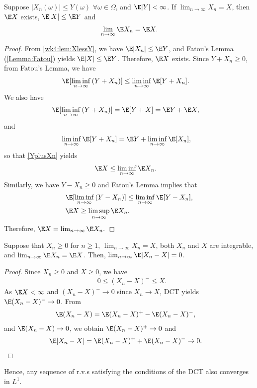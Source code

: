 \documentclass[../aipt.tex]{subfiles}
\begin{document}
\begin{Theorem}\label{Dominated Convergence Theorem}
Suppose $|X_n(\omega)| \leq Y(\omega)$ $\forall \omega\in\Omega$, and $\E |Y|< \infty$. If $\lim_{n\to \infty}{X_n}=X$, then $\E X$ exists, $\E|X|\leq \E Y$ and 
\begin{align*}
\lim_{n \to \infty}{\E X_n} = \E X. 
\end{align*}
\end{Theorem}
\begin{proof}
From \cref{wk4:lem:XlessY}, we have $\E|X_n|\leq \E Y$, and Fatou's Lemma (\cref{Lemma:Fatou}) yields $\E|X|\leq \E Y$. Therefore, $\E X$ exists. Since $Y + X_n \geq 0$, from Fatou's Lemma, we have
\begin{align}
& \E [\liminf_{n \to \infty}{(Y+X_n)}]\leq  \liminf_{n \to \infty}{ \E [Y+X_n]}.\label{YplusXn}
\end{align}
We also have
\begin{align*}
& \E [\liminf_{n \to \infty}{(Y+X_n)}]= \E [Y+X]=\E Y +\E X,
\end{align*}
and 
\begin{align*}
& \liminf_{n \to \infty}{ \E [Y+X_n]}=\E Y +\liminf_{n \to \infty}{ \E [X_n]},
\end{align*}
so that \cref{YplusXn} yields
\begin{align*}
& \E X \leq \liminf_{n \to \infty}{ \E X_n}.
\end{align*}
Similarly, we have $Y-X_n\geq 0$ and Fatou's Lemma implies that
\begin{align*}
& \E [\liminf_{n \to \infty}{(Y-X_n)}]\leq  \liminf_{n \to \infty}{ \E [Y-X_n]},\\
& \E X \geq \limsup_{n \to \infty}{ \E X_n}.
\end{align*}
Therefore, $\E X = \lim_{n \to \infty}{ \E X_n}.$
\end{proof}

\begin{Lemma}[Scheffe] \label{Lemma:Scheffe's Lemma}
Suppose that $X_n\geq 0$ for $n\geq1$, $\lim_{n\to \infty}{X_n}= X$, both $X_n$ and $X$ are integrable, and $\lim_{n\to \infty}{\E X_n}= \E X$. Then, $\lim_{n\to \infty}{\E |X_n-X|}=0$.
\end{Lemma}
\begin{proof}
Since $X_n\geq 0$ and $X\geq0$, we have
\begin{align*}
&0\leq (X_n-X)^- \leq X.
\end{align*}
As $\E X <\infty$ and $(X_n-X)^- \to 0$ since $X_n \to X$, DCT yields $\E(X_n-X)^- \to 0$. From
\begin{align*}
&\E (X_n-X)=\E (X_n-X)^+-\E (X_n-X)^-,
\end{align*}
and $\E (X_n-X) \to 0$, we obtain $\E (X_n-X)^+ \to 0$ and
\begin{align*}
\E |X_n-X|&=\E (X_n-X)^++\E (X_n-X)^-\to 0.
\end{align*}
\end{proof}
Hence, any sequence of r.v.s satisfying the conditions of the DCT also converges in $L^1$. 
\end{document}
